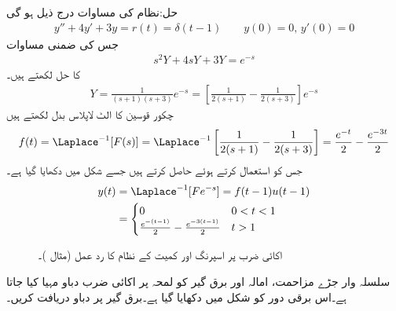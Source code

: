 حل:نظام کی مساوات درج ذیل ہو گی
\begin{align*}
y''+4y'+3y=r(t)=\delta(t-1)\quad \quad y(0)=0,\, y'(0)=0
\end{align*}
جس کی ضمنی مساوات 
\begin{align*}
s^2Y+4sY+3Y=e^{-s}
\end{align*}
کا حل لکھتے ہیں۔
\begin{align*}
Y=\frac{1}{(s+1)(s+3)}e^{-s}=\left[\frac{1}{2(s+1)}-\frac{1}{2(s+3)}\right]e^{-s}
\end{align*}
چکور قوسین کا الٹ لاپلاس بدل لکھتے ہیں
\begin{align*}
f(t)=\Laplace^{-1}[F(s)]=\Laplace^{-1}\left[\frac{1}{2(s+1)}-\frac{1}{2(s+3)}\right]=\frac{e^{-t}}{2}-\frac{e^{-3t}}{2}
\end{align*}
جس کو استعمال کرتے ہوئے  حاصل کرتے ہیں جسے شکل  میں دکھایا گیا ہے۔
\begin{align*}
y(t)&=\Laplace^{-1}[Fe^{-s}]=f(t-1)u(t-1)\\
&=
\begin{cases}
0& 0<t<1\\
\frac{e^{-(t-1)}}{2}-\frac{e^{-3(t-1)}}{2}& t>1
\end{cases}
\end{align*}
%
\begin{figure}
\centering
{}
\caption{اکائی ضرب پر اسپرنگ اور کمیت کے نظام کا رد عمل (مثال )۔}
\label{شکل_مثال_لاپلاس_اسپرنگ_کمیت_اکائی_ضرب_الف}
\end{figure}
سلسلہ وار جڑے مزاحمت، امالہ اور برق گیر کو لمحہ  پر  اکائی ضرب دباو مہیا کیا جاتا ہے۔اس برقی دور کو شکل  میں دکھایا گیا ہے۔برق گیر پر دباو  دریافت کریں۔ 
